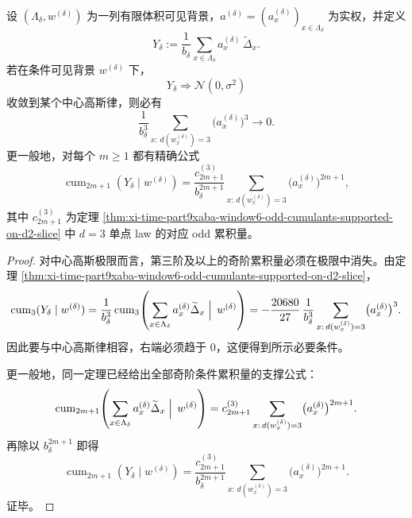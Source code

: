 \begin{proposition}\label{prop:xi-time-part9xaba-window6-gaussian-compatibility-necessary-condition}
设 \((\Lambda_\delta,w^{(\delta)})\) 为一列有限体积可见背景，\(a^{(\delta)}=(a_x^{(\delta)})_{x\in\Lambda_\delta}\) 为实权，并定义
\[
Y_\delta
:=
\frac{1}{b_\delta}
\sum_{x\in\Lambda_\delta}
a_x^{(\delta)}\,\widetilde\Delta_x.
\]
若在条件可见背景 \(w^{(\delta)}\) 下，
\[
Y_\delta\Longrightarrow \mathcal N(0,\sigma^2)
\]
收敛到某个中心高斯律，则必有
\[
\frac{1}{b_\delta^3}
\sum_{x:\,d(w_x^{(\delta)})=3}
\bigl(a_x^{(\delta)}\bigr)^3
\longrightarrow 0.
\]
更一般地，对每个 \(m\ge 1\) 都有精确公式
\[
\operatorname{cum}_{2m+1}(Y_\delta\mid w^{(\delta)})
=
\frac{c_{2m+1}^{(3)}}{b_\delta^{2m+1}}
\sum_{x:\,d(w_x^{(\delta)})=3}
\bigl(a_x^{(\delta)}\bigr)^{2m+1},
\]
其中 \(c_{2m+1}^{(3)}\) 为定理 \ref{thm:xi-time-part9xaba-window6-odd-cumulants-supported-on-d2-slice} 中 \(d=3\) 单点 law 的对应 odd 累积量。
\end{proposition}
\begin{proof}
对中心高斯极限而言，第三阶及以上的奇阶累积量必须在极限中消失。由定理 \ref{thm:xi-time-part9xaba-window6-odd-cumulants-supported-on-d2-slice}，
\[
\operatorname{cum}_3(Y_\delta\mid w^{(\delta)})
=
\frac{1}{b_\delta^3}
\operatorname{cum}_3\!\left(
\sum_{x\in\Lambda_\delta}
a_x^{(\delta)}\widetilde\Delta_x
\Bigm|\,
w^{(\delta)}
\right)
=
-\frac{20680}{27}\,
\frac{1}{b_\delta^3}
\sum_{x:\,d(w_x^{(\delta)})=3}
\bigl(a_x^{(\delta)}\bigr)^3.
\]
因此要与中心高斯律相容，右端必须趋于 \(0\)，这便得到所示必要条件。

更一般地，同一定理已经给出全部奇阶条件累积量的支撑公式：
\[
\operatorname{cum}_{2m+1}\!\left(
\sum_{x\in\Lambda_\delta}
a_x^{(\delta)}\widetilde\Delta_x
\Bigm|\,
w^{(\delta)}
\right)
=
c_{2m+1}^{(3)}
\sum_{x:\,d(w_x^{(\delta)})=3}
\bigl(a_x^{(\delta)}\bigr)^{2m+1}.
\]
再除以 \(b_\delta^{2m+1}\) 即得
\[
\operatorname{cum}_{2m+1}(Y_\delta\mid w^{(\delta)})
=
\frac{c_{2m+1}^{(3)}}{b_\delta^{2m+1}}
\sum_{x:\,d(w_x^{(\delta)})=3}
\bigl(a_x^{(\delta)}\bigr)^{2m+1}.
\]
证毕。
\end{proof}

